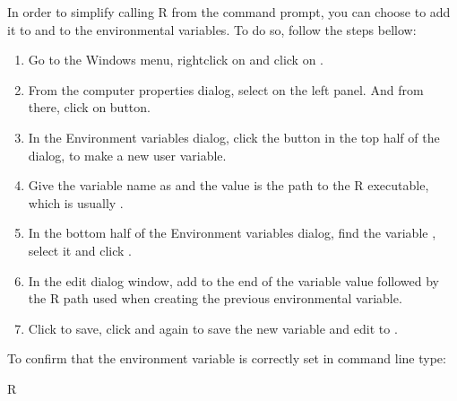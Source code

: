\documentclass[letterpaper,10pt,english]{sphinxmanual}
\begin{document}
In order to simplify calling R from the command prompt, you can choose to add it to  and to the environmental variables. To do so, follow the steps bellow:
\begin{enumerate}
%
\item {} 
Go to the Windows menu, right\sphinxhyphen{}click on  and click on .

\item {} 
From the computer properties dialog, select  on the left panel. And from there, click on  button.

\item {} 
In the Environment variables dialog, click the  button in the top half of the dialog, to make a new user variable.

\item {} 
Give the variable name as  and the value is the path to the R executable, which is usually .

\item {} 
In the bottom half of the Environment variables dialog, find the variable , select it and click .

\item {} 
In the edit dialog window, add \sphinxcode{\sphinxupquote{;}} to the end of the variable value followed by the R path used when creating the previous environmental variable.

\item {} 
Click  to save, click  and  again to save the new variable and edit to .

\end{enumerate}

To confirm that the environment variable is correctly set in command line type:

\begin{sphinxVerbatim}[commandchars=\\\{\}]
\PYGZgt{}  \PYGZpc{}R\PYGZpc{}
\end{sphinxVerbatim}
\end{document}
